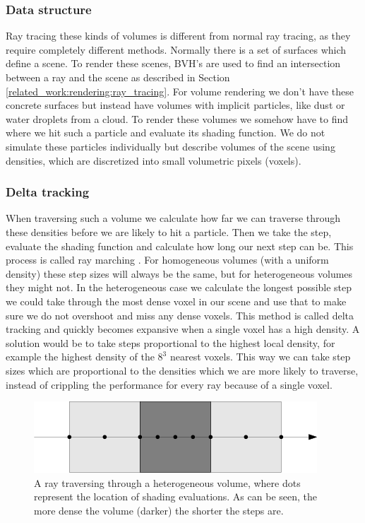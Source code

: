 \subsubsection{Data structure} \label{related_work:path_traced_volume_rendering:data_structure}
Ray tracing these kinds of volumes is different from normal ray tracing, as they require completely different methods. Normally there is a set of surfaces which define a scene. To render these scenes, BVH's are used to find an intersection between a ray and the scene as described in Section \ref{related_work:rendering:ray_tracing}. For volume rendering we don't have these concrete surfaces but instead have volumes with implicit particles, like dust or water droplets from a cloud. To render these volumes we somehow have to find where we hit such a particle and evaluate its shading function. We do not simulate these particles individually but describe volumes of the scene using densities, which are discretized into small volumetric pixels (voxels).

\subsubsection{Delta tracking} \label{related_work:path_traced_volume_rendering:delta_tracking}
When traversing such a volume we calculate how far we can traverse through these densities before we are likely to hit a particle. Then we take the step, evaluate the shading function and calculate how long our next step can be. This process is called ray marching \cite{RenderingWithTwoTriangles}. For homogeneous volumes (with a uniform density) these step sizes will always be the same, but for heterogeneous volumes they might not. In the heterogeneous case we calculate the longest possible step we could take through the most dense voxel in our scene and use that to make sure we do not overshoot and miss any dense voxels. This method is called delta tracking \cite{kutz2017spectral} and quickly becomes expansive when a single voxel has a high density. A solution would be to take steps proportional to the highest local density, for example the highest density of the $8^3$ nearest voxels. This way we can take step sizes which are proportional to the densities which we are more likely to traverse, instead of crippling the performance for every ray because of a single voxel.

\begin{figure}[H]
    \centering
    \includegraphics[width=0.9\linewidth]{figures/sample_step_size.png}
    \caption{A ray traversing through a heterogeneous volume, where dots represent the location of shading evaluations. As can be seen, the more dense the volume (darker) the shorter the steps are.}
    \label{fig:sample_step_size}
\end{figure}


